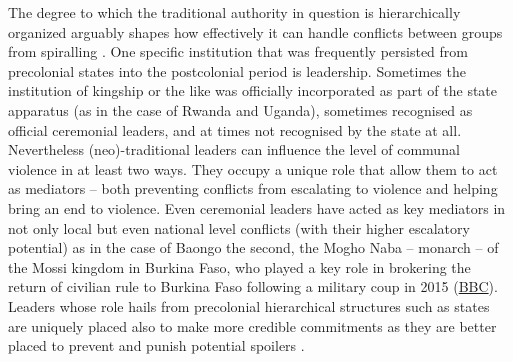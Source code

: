 The degree to which the traditional authority in question is hierarchically
organized arguably shapes how effectively it can handle conflicts between groups
from spiralling \citep[46]{Wig2018}. One specific institution that was
frequently persisted from precolonial states into the postcolonial period is
leadership. Sometimes the institution of kingship or the like was officially
incorporated as part of the state apparatus (as in the case of Rwanda and
Uganda), sometimes recognised as official ceremonial leaders, and at times not
recognised by the state at all. Nevertheless (neo)-traditional leaders can
influence the level of communal violence in at least two ways. They occupy a
unique role that allow them to act as mediators -- both preventing conflicts
from escalating to violence and helping bring an end to violence. Even
ceremonial leaders have acted as key mediators in not only local but even
national level conflicts (with their higher escalatory potential) as in the case
of Baongo the second, the Mogho Naba -- monarch -- of the Mossi kingdom in
Burkina Faso, who played a key role in brokering the return of civilian rule to
Burkina Faso following a military coup in 2015
(\href{https://www.bbc.com/news/world-africa-34340704}{BBC}). Leaders whose role
hails from precolonial hierarchical structures such as states are uniquely
placed also to make more credible commitments as they are better placed to
prevent and punish potential spoilers \citep{Wig2016}.

% 

